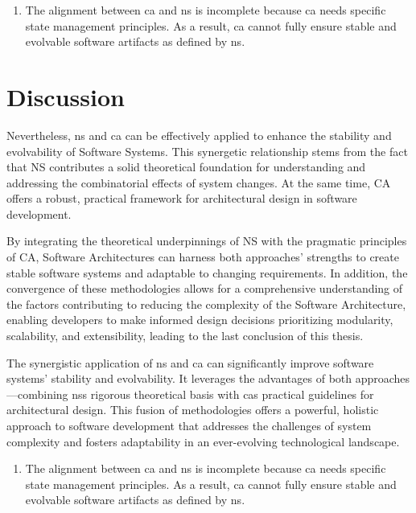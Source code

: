 \begin{enumerate}[leftmargin=*]
    \item The alignment between \gls{ca} and \gls{ns} is incomplete because \gls{ca} needs
    specific state management principles. As a result, \gls{ca} cannot fully ensure stable and
    evolvable software artifacts as defined by \gls{ns}.
\end{enumerate}

\section{Discussion}

Nevertheless, \gls{ns} and \gls{ca} can be effectively applied to enhance the stability and evolvability
of Software Systems. This synergetic relationship stems from the fact that NS contributes
a solid theoretical foundation for understanding and addressing the combinatorial effects
of system changes. At the same time, CA offers a robust, practical framework for
architectural design in software development.

By integrating the theoretical underpinnings of NS with the pragmatic principles of CA,
Software Architectures can harness both approaches' strengths to create stable software
systems and adaptable to changing requirements. In addition, the convergence of these
methodologies allows for a comprehensive understanding of the factors contributing to
reducing the complexity of the Software Architecture, enabling developers to make informed
design decisions prioritizing modularity, scalability, and extensibility, leading to the
last conclusion of this thesis.

The synergistic application of \gls{ns} and \gls{ca} can significantly improve software
systems' stability and evolvability. It leverages the advantages of both
approaches—combining \glspl{ns} rigorous theoretical basis with \glspl{ca} practical
guidelines for architectural design. This fusion of methodologies offers a powerful,
holistic approach to software development that addresses the challenges of system
complexity and fosters adaptability in an ever-evolving technological landscape.


\begin{enumerate}[resume, leftmargin=*]
    \item The alignment between \gls{ca} and \gls{ns} is incomplete because \gls{ca} needs
    specific state management principles. As a result, \gls{ca} cannot fully ensure stable and
    evolvable software artifacts as defined by \gls{ns}.
\end{enumerate}

